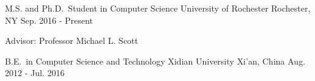 

\begin{cventries}

  \cventry
    {M.S. and Ph.D.\ Student in Computer Science} %
    {University of Rochester} %
    {Rochester, NY} %
    {Sep. 2016 - Present} %
    {
      \begin{cvitems} %
        \item {Advisor: Professor Michael L. Scott}
      \end{cvitems}
    }

  \cventrys
    {B.E.\ in Computer Science and Technology} %
    {Xidian University} %
    {Xi'an, China} %
    {Aug. 2012 - Jul. 2016} %

\end{cventries}
